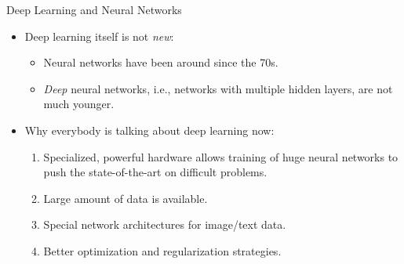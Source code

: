 \documentclass[11pt,compress,t,notes=noshow, xcolor=table]{beamer}
\begin{document}
\begin{frame} {Deep Learning and Neural Networks}
\begin{itemize}
\vspace{.3cm}
\item Deep learning itself is not \textit{new}:
\begin{itemize}
\item Neural networks have been around since the 70s.
\item \textit{Deep} neural networks, i.e., networks with multiple hidden layers, are not much younger.
\end{itemize}
\vspace{.3cm}
\item Why everybody is talking about deep learning now:
\begin{enumerate}
\vspace{.1cm}
\item Specialized, powerful hardware allows training of huge neural networks to push the state-of-the-art on difficult problems.
\vspace{.2cm}
\item Large amount of data is available.
\vspace{.2cm}
\item Special network architectures for image/text data.
\vspace{.2cm}
\item Better optimization and regularization strategies.
\end{enumerate}
\end{itemize}
\end{frame}
\end{document}
